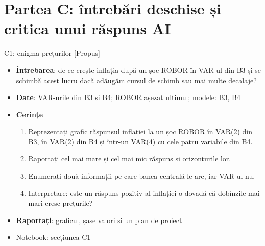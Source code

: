 \section{Partea C: întrebări deschise și critica unui răspuns AI}

\begin{frame}{C1: enigma prețurilor [Propus]}
\itemsize{\footnotesize}
\begin{itemize}
\item \textbf{Întrebarea}: de ce crește inflația după un șoc ROBOR în VAR-ul din B3 și se schimbă acest lucru dacă adăugăm cursul de schimb sau mai multe decalaje?
\item \textbf{Date}: VAR-urile din B3 și B4; ROBOR așezat ultimul; modele: B3, B4
\item \textbf{Cerințe}
\begin{enumerate}
    \item Reprezentați grafic răspunsul inflației la un șoc ROBOR în VAR(2) din B3, în VAR(2) din B4 și într-un VAR(4) cu cele patru variabile din B4.
    \item Raportați cel mai mare și cel mai mic răspuns și orizonturile lor.
    \item Enumerați două informații pe care banca centrală le are, iar VAR-ul nu.
    \item Interpretare: este un răspuns pozitiv al inflației o dovadă că dobînzile mai mari cresc prețurile?
\end{enumerate}
\item \textbf{Raportați}: graficul, șase valori și un plan de proiect
\item Notebook: secțiunea C1
\end{itemize}
\end{frame}

